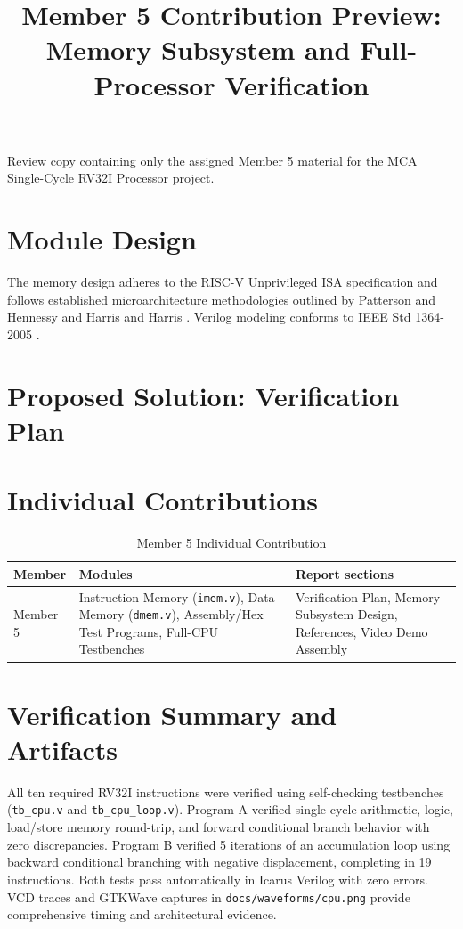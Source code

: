 \documentclass[conference]{IEEEtran}
\begin{document}
\title{Member 5 Contribution Preview: Memory Subsystem and Full-Processor Verification}
\author{}
\maketitle

\begin{center}
\footnotesize Review copy containing only the assigned Member 5 material for the MCA Single-Cycle RV32I Processor project.
\end{center}

\section{Module Design}

The memory design adheres to the RISC-V Unprivileged ISA specification \cite{riscvspec2019} and follows established microarchitecture methodologies outlined by Patterson and Hennessy \cite{patterson2020computer} and Harris and Harris \cite{harris2021digital}. Verilog modeling conforms to IEEE Std 1364-2005 \cite{ieee1364verilog}.

\section{Proposed Solution: Verification Plan}


\section{Individual Contributions}
\begin{table}[htbp]
\centering
\caption{Member 5 Individual Contribution}
\begin{tabular}{lp{3.1cm}p{3.2cm}}
\toprule
Member & Modules & Report sections \\
\midrule
Member 5 & Instruction Memory (\texttt{imem.v}), Data Memory (\texttt{dmem.v}), Assembly/Hex Test Programs, Full-CPU Testbenches & Verification Plan, Memory Subsystem Design, References, Video Demo Assembly \\
\bottomrule
\end{tabular}
\end{table}

\section{Verification Summary and Artifacts}
All ten required RV32I instructions were verified using self-checking testbenches (\texttt{tb\_cpu.v} and \texttt{tb\_cpu\_loop.v}). Program A verified single-cycle arithmetic, logic, load/store memory round-trip, and forward conditional branch behavior with zero discrepancies. Program B verified 5 iterations of an accumulation loop using backward conditional branching with negative displacement, completing in 19 instructions. Both tests pass automatically in Icarus Verilog with zero errors. VCD traces and GTKWave captures in \texttt{docs/waveforms/cpu.png} provide comprehensive timing and architectural evidence.



\end{document}
